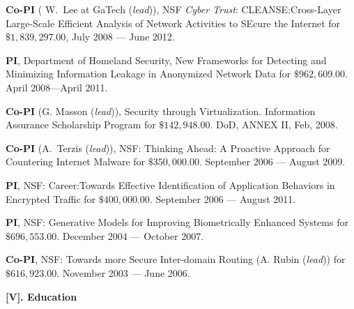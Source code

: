 \documentclass[11pt]{article}
\newcommand{\alignboth}[2]{\noindent \parbox[t]{85pt} {\bf#1} \parbox[t]{400pt}{#2} \vspace{0.5\baselineskip} }
\newcommand{\headingsgap}{\vspace{\baselineskip}}
\newenvironment{cvhanglist}{%
  \begin{list}{}{%
    \setlength{\leftmargin}{1.8em}%
    \setlength{\itemindent}{-1.8em}%
    \setlength{\labelwidth}{0pt}%
    \setlength{\labelsep}{0pt}%
    \setlength{\itemsep}{0.35em}%
    \setlength{\parsep}{0pt}%
    \setlength{\topsep}{0.25em}%
  }%
}{\end{list}}
\begin{document}
\begin{cvhanglist}
\begin{cvhanglist}
{\item {\bf Co-PI} ( W.~Lee at GaTech ({\it lead})), NSF {\it Cyber Trust}: {\sc CLEANSE:Cross-Layer
 Large-Scale Efficient Analysis of Network Activities to SEcure the
 Internet} for $\$1,839,297.00$, July 2008
 --- June 2012. \hfill \hfill

 \item {\bf PI}, Department of Homeland Security, {\sc New Frameworks
 for Detecting and Minimizing Information Leakage in Anonymized
 Network Data} for
 $\$962,609.00$. April 2008---April 2011.

 \item {\bf Co-PI} (G. Masson ({\it lead})), {\sc Security through
 Virtualization}. Information Assurance Scholarship Program for
 $\$142,948.00$. DoD, ANNEX II, Feb, 2008. \hfill

 \item {\bf Co-PI} (A.~Terzis ({\it lead})), NSF: {\sc Thinking Ahead: A
 Proactive Approach for Countering Internet Malware} for $\$350,000.00$. September 2006 --- August 2009.

\item {\bf PI}, NSF: {\sc Career:Towards Effective
 Identification of Application Behaviors in Encrypted Traffic} for
 $\$400,000.00$. September 2006 --- August 2011.

\item {\bf PI}, NSF: {\sc Generative Models for
 Improving Biometrically Enhanced Systems} for $\$696,553.00$. December 2004 --- October
 2007.

\item {\bf Co-PI}, NSF: {\sc Towards more Secure
 Inter-domain Routing} \hfill (A. Rubin ({\it lead})) for $\$616,923.00$.
 November 2003 --- June 2006.
}
\end{cvhanglist}

\end{cvhanglist}

\headingsgap
\alignboth{[V]. Education} {}
\end{document}
